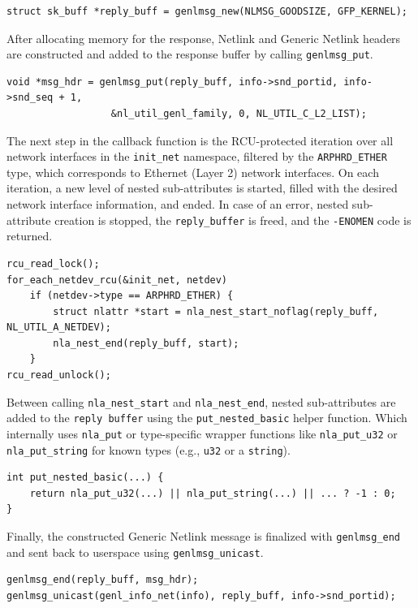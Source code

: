 \documentclass[10pt, letterpaper]{article}
\begin{document}
\begin{lstlisting}[caption={Reply message buffer allocation}]
struct sk_buff *reply_buff = genlmsg_new(NLMSG_GOODSIZE, GFP_KERNEL);
\end{lstlisting}

After allocating memory for the response, Netlink and Generic Netlink headers are
constructed and added to the response buffer by calling \texttt{genlmsg\_put}.
\begin{lstlisting}[caption={Message headers initialization}]
void *msg_hdr = genlmsg_put(reply_buff, info->snd_portid, info->snd_seq + 1,
			      &nl_util_genl_family, 0, NL_UTIL_C_L2_LIST);
\end{lstlisting}

The next step in the callback function is the RCU-protected iteration over all network
interfaces in the \texttt{init\_net} namespace, filtered by the \texttt{ARPHRD\_ETHER}
type, which corresponds to Ethernet (Layer 2) network interfaces. On each iteration, a new
level of nested sub-attributes is started, filled with the desired network interface
information, and ended. In case of an error, nested sub-attribute creation is stopped, the
\texttt{reply\_buffer} is freed, and the \texttt{-ENOMEN} code is returned.
\begin{lstlisting}[caption={Iteration over network interfaces}]
rcu_read_lock();
for_each_netdev_rcu(&init_net, netdev)
    if (netdev->type == ARPHRD_ETHER) {
        struct nlattr *start = nla_nest_start_noflag(reply_buff, NL_UTIL_A_NETDEV);
        nla_nest_end(reply_buff, start);
    }
rcu_read_unlock();
\end{lstlisting}

Between calling \texttt{nla\_nest\_start} and \texttt{nla\_nest\_end}, nested sub-attributes are
added to the \texttt{reply buffer} using the \texttt{put\_nested\_basic} helper function.
Which internally uses \texttt{nla\_put} or type-specific wrapper functions like
\texttt{nla\_put\_u32} or \texttt{nla\_put\_string} for known types (e.g., \texttt{u32} or
a \texttt{string}).
\begin{lstlisting}[caption={Nested sub-attributes placement}]
int put_nested_basic(...) {
    return nla_put_u32(...) || nla_put_string(...) || ... ? -1 : 0;
}
\end{lstlisting}

Finally, the constructed Generic Netlink message is finalized with \texttt{genlmsg\_end}
and sent back to userspace using \texttt{genlmsg\_unicast}.
\begin{lstlisting}[caption={Finalization and sending}]
genlmsg_end(reply_buff, msg_hdr);
genlmsg_unicast(genl_info_net(info), reply_buff, info->snd_portid);
\end{lstlisting}
\end{document}
